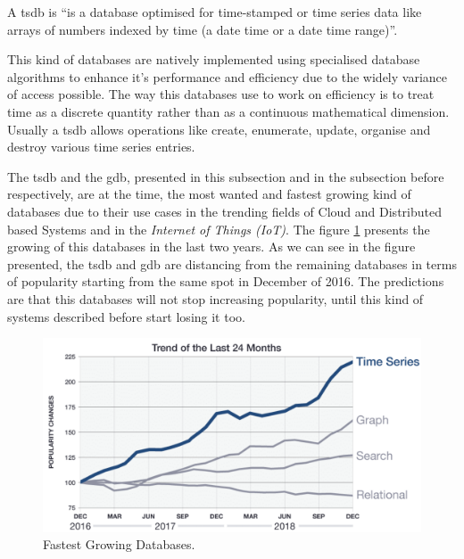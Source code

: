 
A \gls{tsdb} is ``is a database optimised for time-stamped or time series data like arrays of numbers indexed by time (a date time or a date time range)''\cite{time_series_database_definition}.

This kind of databases are natively implemented using specialised database algorithms to enhance it's performance and efficiency due to the widely variance of access possible. The way this databases use to work on efficiency is to treat time as a discrete quantity rather than as a continuous mathematical dimension. Usually a \gls{tsdb} allows operations like create, enumerate, update, organise and destroy various time series entries.

The \gls{tsdb} and the \gls{gdb}, presented in this subsection and in the subsection before respectively, are at the time, the most wanted and fastest growing kind of databases due to their use cases in the trending fields of Cloud and Distributed based Systems and in the \textit{Internet of Things (IoT)}. The figure \ref{fig:fastest_growing_databases} presents the growing of this databases in the last two years. As we can see in the figure presented, the \gls{tsdb} and \gls{gdb} are distancing from the remaining databases in terms of popularity starting from the same spot in December of 2016. The predictions are that this databases will not stop increasing popularity, until this kind of systems described before start losing it too.  

\begin{figure}[H]
    \centering
    \includegraphics[width=1.0\textwidth]{images/popularity_of_time_series_databases.pdf}
    \caption{Fastest Growing Databases.\cite{time_series_databases_explained}}
    \label{fig:fastest_growing_databases}
\end{figure}

